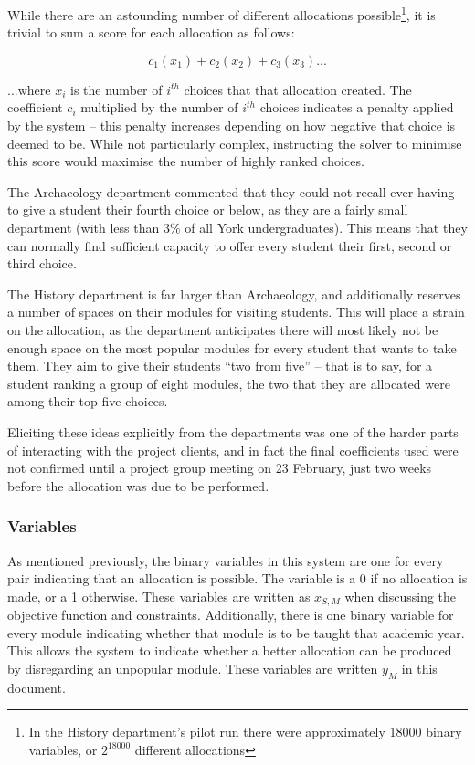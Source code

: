 While there are an astounding number of different allocations
possible\footnote{In the History department's pilot run there were
approximately 18000 binary variables, or $2^{18000}$ different allocations},
it is trivial to sum a score for each allocation as follows:

$$
c_1(x_1) + c_2(x_2) + c_3(x_3) ...
$$

...where $x_i$ is the number of $i^{th}$ choices that that allocation created.
The coefficient $c_i$ multiplied by the number of $i^{th}$ choices indicates a
penalty applied by the system -- this penalty increases depending on how
negative that choice is deemed to be. While not particularly complex,
instructing the solver to minimise this score would maximise the number of
highly ranked choices.

The Archaeology department commented that they could not recall ever having to
give a student their fourth choice or below, as they are a fairly small
department (with less than 3\% of all York undergraduates). This means that
they can normally find sufficient capacity to offer every student their first,
second or third choice.

The History department is far larger than Archaeology, and additionally
reserves a number of spaces on their modules for visiting students. This will
place a strain on the allocation, as the department anticipates there will
most likely not be enough space on the most popular modules for every student
that wants to take them. They aim to give their students ``two from five'' --
that is to say, for a student ranking a group of eight modules, the two that
they are allocated were among their top five choices.

Eliciting these ideas explicitly from the departments was one of the harder
parts of interacting with the project clients, and in fact the final
coefficients used were not confirmed until a project group meeting on 23
February, just two weeks before the allocation was due to be performed.

\subsubsection{Variables}

As mentioned previously, the binary variables in this system are one for every
\studmod pair indicating that an allocation is possible. The variable is a 0
if no allocation is made, or a 1 otherwise. These variables are written as
$x_{S,M}$ when discussing the objective function and constraints.
Additionally, there is one binary variable for every module indicating whether
that module is to be taught that academic year. This allows the system to
indicate whether a better allocation can be produced by disregarding an
unpopular module. These variables are written $y_{M}$ in this document.

